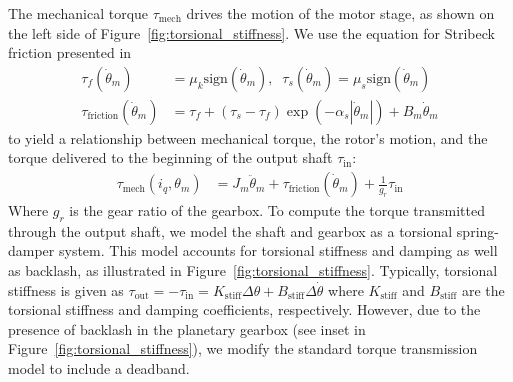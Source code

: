 \documentclass[twocolumn,letterpaper]{IEEEAerospaceCLS}  %
\begin{document}
The mechanical torque $\tau_{\text{mech}}$ drives the motion of the motor stage, as shown on the left side of Figure~\ref{fig:torsional_stiffness}. We use the equation for Stribeck friction presented in ~\textbf{\cite{armstrong1994survey}}
\begin{align*}
\tau_{f}(\dot{\theta}_m)&=\mu_k\text{sign}(\dot{\theta}_m),\;\;\tau_{s}(\dot{\theta}_m)=\mu_s\text{sign}(\dot{\theta}_m)\\
\tau_{\text{friction}}(\dot{\theta}_m)&=\tau_{f}+(\tau_{s}-\tau_{f})\exp\left(-\alpha_{s}|\dot{\theta}_m|\right)+B_m\dot{\theta}_m
\end{align*}
to yield a relationship between mechanical torque, the rotor's motion, and the torque delivered to the beginning of the output shaft $\tau_{\text{in}}$:
\begin{align*}
\tau_{\text{mech}}(i_q,\theta_m) &= J_m\ddot{\theta}_m + \tau_{\text{friction}}(\dot{\theta}_m) + \frac{1}{g_r}\tau_{\text{in}}
\end{align*}
Where $g_r$ is the gear ratio of the gearbox. To compute the torque transmitted through the output shaft, we model the shaft and gearbox as a torsional spring-damper system. This model accounts for torsional stiffness and damping as well as backlash, as illustrated in Figure~\ref{fig:torsional_stiffness}. Typically, torsional stiffness is given as $\tau_{\text{out}}=-\tau_{\text{in}}=K_{\text{stiff}}\Delta\theta+B_{\text{stiff}}\Delta\dot{\theta}$ where $K_{\text{stiff}}$ and $B_{\text{stiff}}$ are the torsional stiffness and damping coefficients, respectively. However, due to the presence of backlash in the planetary gearbox (see inset in Figure~\ref{fig:torsional_stiffness}), we modify the standard torque transmission model to include a deadband.
\end{document}
